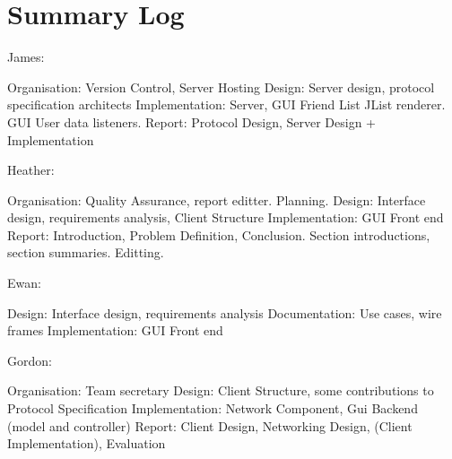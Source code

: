 \section{Summary Log}
\label{sumlog}

James:

Organisation: Version Control, Server Hosting
Design: Server design, protocol specification architects
Implementation: Server, GUI Friend List JList renderer. GUI User data listeners.
Report: Protocol Design, Server Design + Implementation

Heather:

Organisation: Quality Assurance, report editter. Planning.
Design: Interface design, requirements analysis, Client Structure
Implementation: GUI Front end
Report: Introduction, Problem Definition, Conclusion. Section introductions, section summaries. Editting. 


Ewan:

Design: Interface design, requirements analysis
Documentation: Use cases, wire frames
Implementation: GUI Front end

Gordon:

Organisation: Team secretary
Design: Client Structure, some contributions to Protocol Specification 
Implementation: Network Component, Gui Backend (model and controller)
Report: Client Design, Networking Design, (Client Implementation), Evaluation
